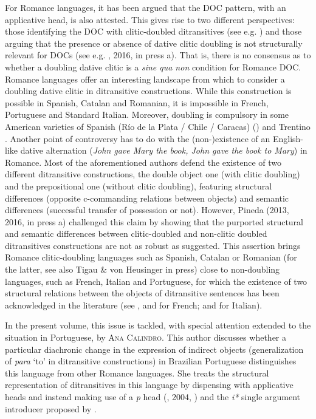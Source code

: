 \documentclass[output=paper,modfonts,nonflat,colorlinks,citecolor=brown]{langsci/langscibook}
\begin{document}
For Romance languages, it has been argued that the DOC pattern, with an applicative head, is also attested. This gives rise to two different perspectives: those identifying the DOC with clitic-doubled ditransitives (see e.g. \citealt{Cuervo2003}) and those arguing that the presence or absence of dative clitic doubling is not structurally relevant for DOCs (see e.g. \citealt{Pineda2013}, 2016, in press a). That is, there is no consensus as to whether a doubling dative clitic is a {\textit{sine qua non}} condition for Romance DOC. Romance languages offer an interesting landscape from which to consider a doubling dative clitic in ditransitive constructions. While this construction is possible in Spanish, Catalan and Romanian, it is impossible in French, Portuguese and Standard Italian. Moreover, doubling is compulsory in some American varieties of Spanish (Río de la Plata / Chile / Caracas) (\citealt{Parodi1998,Senn2008,Pujalte2009}) and Trentino \citep{Cordin1993}. Another point of controversy has to do with the (non-)existence of an English-like dative alternation (\textit{John gave Mary the book, John gave the book to Mary}) in Romance. Most of the aforementioned authors defend the existence of two different ditransitive constructions, the double object one (with clitic doubling) and the prepositional one (without clitic doubling), featuring structural differences (opposite c-commanding relations between objects) and semantic differences (successful transfer of possession or not). However, Pineda (2013, 2016, in press a) challenged this claim by showing that the purported structural and semantic differences between clitic-doubled and non-clitic doubled ditransitives constructions are not as robust as suggested. This assertion brings Romance clitic-doubling languages such as Spanish, Catalan or Romanian (for the latter, see also Tigau \& von Heusinger in press) close to non-doubling languages, such as French, Italian and Portuguese, for which the existence of two structural relations between the objects of ditransitive sentences has been acknowledged in the literature (see \citealt{Harley2002,Anagnostopoulou2003,Fournier2010}, and \citealt{BonehNash2011} for French; and \citealt{GiorgiLongobardi1991,McGinnis2001,Harley2002} for Italian). 



In the present volume, this issue is tackled, with special attention extended to the situation in Portuguese, by {\textsc{Ana Calindro.}}  This author discusses whether a particular diachronic change in the expression of indirect objects (generalization of {\textit{para}} ‘to’ in ditransitive constructions) in Brazilian Portuguese distinguishes this language from other Romance languages. She treats the structural representation of ditransitives in this language by dispensing with applicative heads and instead making use of a {\textit{p}} head (\citealt{Svenonius2003}, 2004, \citealt{Wood2012}) and the {\textit{i*}} single argument introducer proposed by \citet{WoodMarantz2017}. 
\end{document}
